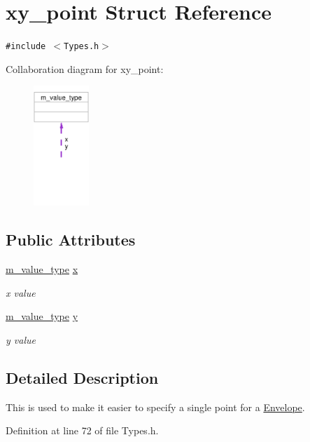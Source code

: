 \hypertarget{structxy__point}{
\section{xy\_\-point Struct Reference}
\label{structxy__point}
}
{\tt \#include $<$Types.h$>$}

Collaboration diagram for xy\_\-point:\begin{figure}[H]
\begin{center}
\leavevmode
\includegraphics[width=59pt]{structxy__point__coll__graph}
\end{center}
\end{figure}
\subsection*{Public Attributes}
\begin{CompactItemize}
\item 
\hyperlink{Types_8h_a3}{m\_\-value\_\-type} \hyperlink{structxy__point_o0}{x}
\begin{CompactList}\small\item\em x value \item\end{CompactList}\item 
\hyperlink{Types_8h_a3}{m\_\-value\_\-type} \hyperlink{structxy__point_o1}{y}
\begin{CompactList}\small\item\em y value \item\end{CompactList}\end{CompactItemize}


\subsection{Detailed Description}
This is used to make it easier to specify a single point for a \hyperlink{classEnvelope}{Envelope}. 



Definition at line 72 of file Types.h.

